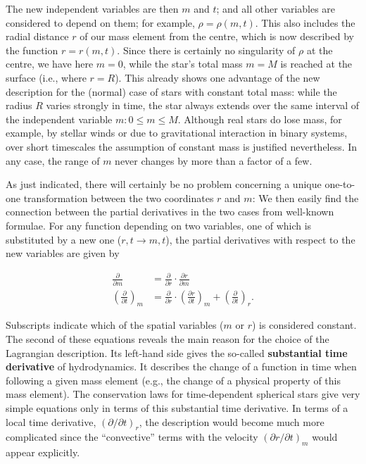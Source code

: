\documentclass[a4paper,10pt]{article}
\begin{document}
{\noindent}The new independent variables are then $m$ and $t$; and all other variables are considered to depend on them; for example, $\rho=\rho(m,t)$. This also includes the radial distance $r$ of our mass element from the centre, which is now described by the function $r=r(m,t)$. Since there is certainly no singularity of $\rho$ at the centre, we have here $m=0$, while the star's total mass $m=M$ is reached at the surface (i.e., where $r=R$). This already shows one advantage of the new description for the (normal) case of stars with constant total mass: while the radius $R$ varies strongly in time, the star always extends over the same interval of the independent variable $m:0\leq m \leq M$. Although real stars do lose mass, for example, by stellar winds or due to gravitational interaction in binary systems, over short timescales the assumption of constant mass is justified nevertheless. In any case, the range of $m$ never changes by more than a factor of a few.

{\noindent}As just indicated, there will certainly be no problem concerning a unique one-to-one transformation between the two coordinates $r$ and $m$: We then easily find the connection between the partial derivatives in the two cases from well-known formulae. For any function depending on two variables, one of which is substituted by a new one ($r,t\rightarrow m,t$), the partial derivatives with respect to the new variables are given by

\begin{align*}
    \frac{\partial}{\partial m} &= \frac{\partial}{\partial r} \cdot \frac{\partial r}{\partial m} \\
    \left(\frac{\partial}{\partial t}\right)_m &= \frac{\partial}{\partial r}\cdot \left(\frac{\partial r}{\partial t}\right)_m + \left(\frac{\partial}{\partial t}\right)_r.
\end{align*}

{\noindent}Subscripts indicate which of the spatial variables ($m$ or $r$) is considered constant. The second of these equations reveals the main reason for the choice of the Lagrangian description. Its left-hand side gives the so-called \textbf{substantial time derivative} of hydrodynamics. It describes the change of a function in time when following a given mass element (e.g., the change of a physical property of this mass element). The conservation laws for time-dependent spherical stars give very simple equations only in terms of this substantial time derivative. In terms of a local time derivative, $(\partial/\partial t)_r$, the description would become much more complicated since the ``convective'' terms with the velocity $(\partial r/\partial t)_m$ would appear explicitly.
\end{document}
